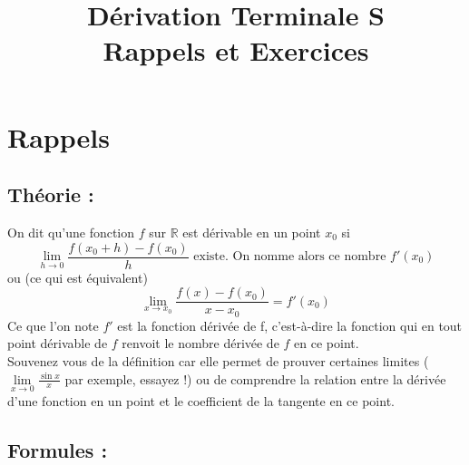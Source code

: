 \documentclass[11pt]{article}
\title{Dérivation Terminale S\\
        \large Rappels et Exercices}
\date{}
\author{}
\newcommand{\R}{\mathbb R}
\begin{document}
    
    \maketitle
    
    \section{Rappels}
        \subsection{Théorie :}
        On dit qu'une fonction $f$ sur $\R$ est dérivable en un point $x_0$ si
        \begin{equation}
            \lim\limits_{h \to 0} \frac{f(x_0 + h)-f(x_0)}{h} \text{ existe. On nomme alors ce nombre $f'(x_0)$} 
        \end{equation}
        ou (ce qui est équivalent)
        \begin{equation*}
            \lim\limits_{x \to x_0} \frac{f(x)-f(x_0)}{x-x_0} = f'(x_0)            
        \end{equation*}
        Ce que l'on note $f'$ est la fonction dérivée de f, c'est-à-dire la fonction qui en tout point dérivable de $f$ renvoit le nombre dérivée de $f$ en ce point.\\
        Souvenez vous de la définition car elle permet de prouver certaines limites ($\lim\limits_{x \to 0} \frac{\sin{x}}{x}$ par exemple, essayez !) ou de comprendre la relation entre la dérivée d'une fonction en un point et le coefficient de la tangente en ce point.

        \subsection{Formules :}
\end{document}
